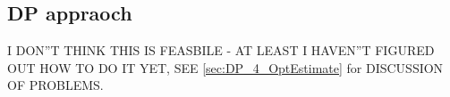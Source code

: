 \documentclass{article}
\begin{document}
\clearpage

















\subsection{DP appraoch}
I DON''T THINK THIS IS FEASBILE - AT LEAST I HAVEN''T FIGURED OUT HOW TO DO IT
YET, SEE \cref{sec:DP_4_OptEstimate} for DISCUSSION OF PROBLEMS.

% 
% 
%  
%  
% 
% 
% 
% 
% 
\end{document}

